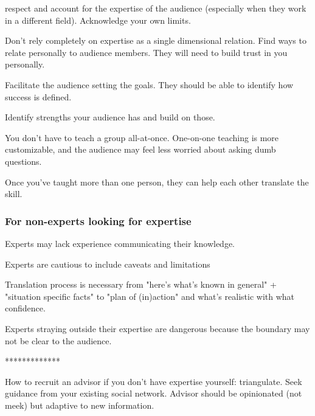 respect and account for the expertise of the audience (especially when they work in a different field). Acknowledge your own limits.

Don't rely completely on expertise as a single dimensional relation. Find ways to relate personally to audience members. They will need to build trust in you personally.

Facilitate the audience setting the goals. They should be able to identify how success is defined.

Identify strengths your audience has and build on those.

You don't have to teach a group all-at-once. One-on-one teaching is more customizable, and the audience may feel less worried about asking dumb questions.

Once you've taught more than one person, they can help each other translate the skill. 


\subsubsection{For non-experts looking for expertise}

Experts may lack experience communicating their knowledge. 

Experts are cautious to include caveats and limitations

Translation process is necessary from "here's what's known in general" + "situation specific facts" to "plan of (in)action" and what's realistic with what confidence. 

Experts straying outside their expertise are dangerous because the boundary may not be clear to the audience.

*************

How to recruit an advisor if you don't have expertise yourself: triangulate. Seek guidance from your existing social network. Advisor should be opinionated (not meek) but adaptive to new information. 